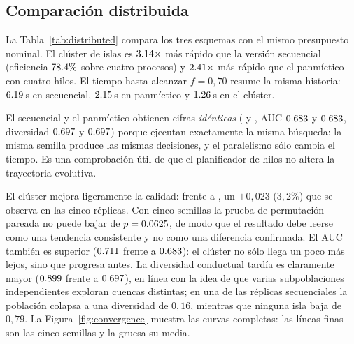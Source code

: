 \documentclass[11pt,a4paper]{article}
\begin{document}
\subsection{Comparaci\'on distribuida}

La Tabla~\ref{tab:distributed} compara los tres esquemas con el mismo
presupuesto nominal.  El cl\'uster de islas es $3.14\times$ m\'as r\'apido
que la versi\'on secuencial (eficiencia $78.4\%$ sobre cuatro
procesos) y $2.41\times$ m\'as r\'apido que el panm\'ictico con cuatro
hilos.  El tiempo hasta alcanzar $f=0{,}70$ resume la misma historia:
$6.19$\,s en secuencial, $2.15$\,s en panm\'ictico y $1.26$\,s en el
cl\'uster.

El secuencial y el panm\'ictico obtienen cifras \emph{id\'enticas}
(\FinalSeq{} y \FinalPan, AUC $0.683$ y $0.683$, diversidad $0.697$ y
$0.697$) porque ejecutan exactamente la misma b\'usqueda: la misma semilla
produce las mismas decisiones, y el paralelismo s\'olo cambia el tiempo.  Es una
comprobaci\'on \'util de que el planificador de hilos no altera la trayectoria
evolutiva.

El cl\'uster mejora ligeramente la calidad: \FinalIsl{} frente a \FinalSeq, un
$+0{,}023$ ($3{,}2\%$) que se observa en las cinco r\'eplicas.  Con cinco
semillas la prueba de permutaci\'on pareada no puede bajar de
$p=0.0625$, de modo que el resultado debe leerse como una tendencia
consistente y no como una diferencia confirmada.  El AUC tambi\'en es superior
($0.711$ frente a $0.683$): el cl\'uster no s\'olo llega un poco m\'as lejos,
sino que progresa antes.  La diversidad conductual tard\'ia es claramente mayor
($0.899$ frente a $0.697$), en l\'inea con la idea de que varias
subpoblaciones independientes exploran cuencas distintas; en una de las
r\'eplicas secuenciales la poblaci\'on colapsa a una diversidad de $0{,}16$,
mientras que ninguna isla baja de $0{,}79$.  La
Figura~\ref{fig:convergence} muestra las curvas completas: las l\'ineas finas
son las cinco semillas y la gruesa su media.

\begin{table}[t]
\centering
\caption{Comparaci\'on de los tres esquemas de ejecuci\'on con el mismo
presupuesto nominal ($T=10\,000$).  Media $\pm$ desviaci\'on sobre cinco
semillas.  La diversidad conductual es la media de las \'ultimas $16$
generaciones.}
\label{tab:distributed}
\resizebox{\linewidth}{!}{}
\end{table}
\end{document}
